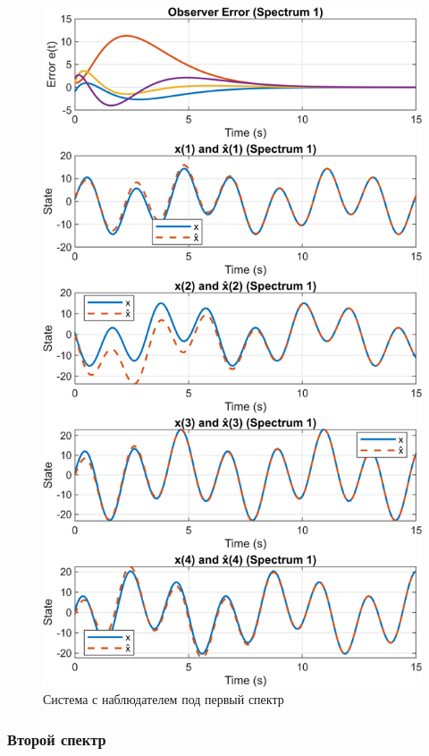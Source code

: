 \begin{figure}[H]
    \centering
    \includegraphics[width=0.8\linewidth]{figs/task2_1.png}
    \caption{Система с наблюдателем под первый спектр}
    \label{fig:2_1}
\end{figure}


\subsubsection{Второй спектр}

